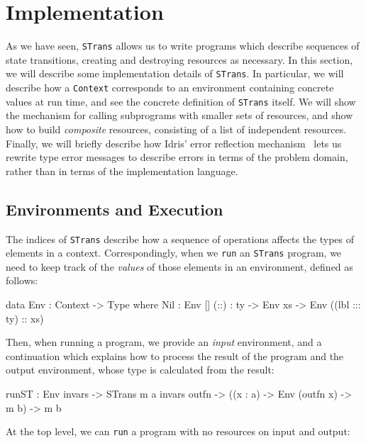 \section{Implementation}

\label{sect:implementst}

As we have seen, \texttt{STrans} allows us to write programs which
describe sequences of state transitions, creating and destroying resources
as necessary. In this section, we will describe some implementation details
of \texttt{STrans}. In particular, we will describe how a \texttt{Context}
corresponds to an environment containing concrete values at run time, and
see the concrete definition of \texttt{STrans} itself. We will show
the mechanism for calling subprograms with smaller sets of resources, and
show how to build \emph{composite} resources, consisting of a list of
independent resources.  Finally, we will briefly describe how Idris' error
reflection mechanism~\citep{christiansen-thesis} lets us rewrite type error
messages to describe errors in terms of the problem domain, rather than in
terms of the implementation language.

\subsection{Environments and Execution}

The indices of \texttt{STrans} describe how a sequence of operations affects
the types of elements in a context. Correspondingly, when we \texttt{run}
an \texttt{STrans} program, we need to keep track of the \emph{values}
of those elements in an environment, defined as follows:

\small
\begin{code}
data Env : Context -> Type where
     Nil : Env []
     (::) : ty -> Env xs -> Env ((lbl ::: ty) :: xs)
\end{code}
\normalsize

Then, when running a program, we provide an \emph{input} environment,
and a continuation which explains how to process the result of the program
and the output environment, whose type is calculated from the result:

\small
\begin{code}
runST : Env invars -> STrans m a invars outfn -> 
        ((x : a) -> Env (outfn x) -> m b) -> m b
\end{code}
\normalsize

At the top level, we can \texttt{run} a program with no resources on
input and output:

